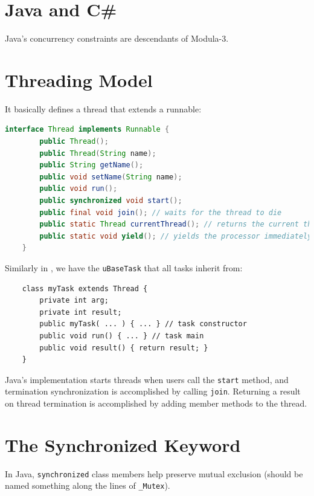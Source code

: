         \section{Java and C\#} %
        \label{sec:java_and_c}
            Java's concurrency constraints are descendants of Modula-3.

            \section{Threading Model} %
            \label{sec:threading_model}
                It basically defines a thread that extends a runnable:
                \begin{lstlisting}[language=Java]
    interface Thread implements Runnable {
        public Thread();
        public Thread(String name);
        public String getName();
        public void setName(String name);
        public void run();
        public synchronized void start();
        public final void join(); // waits for the thread to die
        public static Thread currentThread(); // returns the current thread
        public static void yield(); // yields the processor immediately
    }
                \end{lstlisting}
                Similarly in \uC, we have the \verb|uBaseTask| that all tasks inherit from:
                \begin{lstlisting}
    class myTask extends Thread {
        private int arg;
        private int result;
        public myTask( ... ) { ... } // task constructor
        public void run() { ... } // task main
        public void result() { return result; }
    }
                \end{lstlisting}
                Java's implementation starts threads when users call the \verb|start| method, and termination synchronization is accomplished by calling \verb|join|.
                Returning a result on thread termination is accomplished by adding member methods to the thread.
            \section{The Synchronized Keyword} %
            \label{sec:the_synchronized_keyword}
                In Java, \verb|synchronized| class members help preserve mutual exclusion (should be named something along the lines of \verb|_Mutex|).


